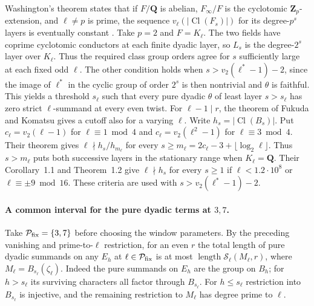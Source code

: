 Washington's theorem states that if \(F/\mathbf Q\) is abelian,
\(F_\infty/F\) is the cyclotomic \(\mathbf Z_p\)-extension, and
\(\ell\ne p\) is prime, the sequence
\(v_\ell(|\operatorname{Cl}(F_s)|)\) for its degree-\(p^s\)
layers is eventually constant
\cite[main theorem, p.~87]{f2-washington-non-p}.
Take \(p=2\) and \(F=K_\ell\). The two fields have coprime
cyclotomic conductors at each finite dyadic layer, so \(L_s\)
is the degree-\(2^s\) layer over \(K_\ell\). Thus the required
class group orders agree for \(s\) sufficiently large at each
fixed odd \(\ell\). The other condition holds when
\(s>v_2(\ell^*-1)-2\), since the image of \(\ell^*\) in the
cyclic group of order \(2^s\) is then nontrivial and \(\theta\) is
faithful. This yields a threshold \(s_\ell\) such that every pure
dyadic \(\theta\) of least layer \(s>s_\ell\) has zero strict
\(\ell\)-summand at every even twist. For \(\ell-1\mid r\), the
theorem of Fukuda and Komatsu gives a cutoff also for a varying
\(\ell\). Write \(h_s=|\operatorname{Cl}(B_s)|\). Put
\(c_\ell=v_2(\ell-1)\) for \(\ell\equiv1\bmod4\) and
\(c_\ell=v_2(\ell^2-1)\) for \(\ell\equiv3\bmod4\).
Their theorem gives \(\ell\nmid h_s/h_{m_\ell}\) for every
\(s\ge m_\ell=2c_\ell-3+\lfloor\log_2\ell\rfloor\).
Thus \(s>m_\ell\) puts both successive layers in the stationary
range when \(K_\ell=\mathbf Q\). Their Corollary~1.1 and
Theorem~1.2 give \(\ell\nmid h_s\) for every \(s\ge1\) if
\(\ell<1.2\cdot10^8\) or \(\ell\equiv\pm9\bmod16\).
\cite[Theorems~1.1--1.2 and Corollary~1.1, pp.~360--361]{f2-fukuda-komatsu-weber}
These criteria are used with \(s>v_2(\ell^*-1)-2\).

\paragraph{A common interval for the pure dyadic terms at \(3,7\).}
%
Take \(\mathcal P_{\rm fix}=\{3,7\}\) before choosing the window
parameters. By the preceding vanishing and prime-to-\(\ell\)
restriction, for an even \(r\) the total length of pure dyadic
summands on any \(E_h\) at \(\ell\in\mathcal P_{\rm fix}\) is at most
\(\operatorname{length}\mathcal S_\ell(M_\ell,r)\), where
\(M_\ell=B_{s_\ell}(\zeta_\ell)\). Indeed the pure summands on
\(E_h\) are the group on \(B_h\); for \(h>s_\ell\) its surviving
characters all factor through \(B_{s_\ell}\). For \(h\le s_\ell\)
restriction into \(B_{s_\ell}\) is injective, and the remaining
restriction to \(M_\ell\) has degree prime to \(\ell\).

